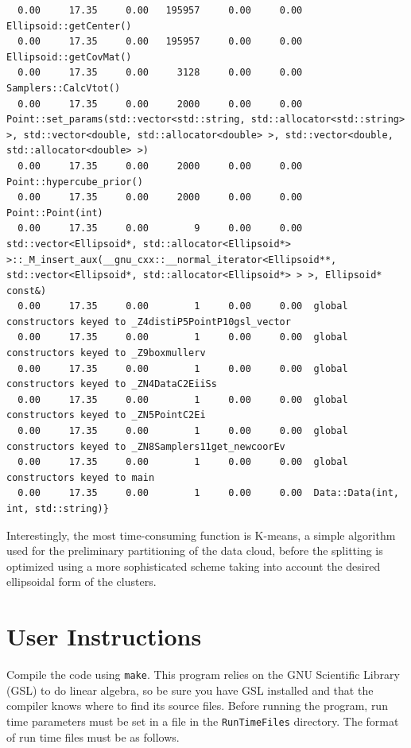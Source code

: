 \documentclass{article}
\begin{document}
\begin{verbatim}
  0.00     17.35     0.00   195957     0.00     0.00  Ellipsoid::getCenter()
  0.00     17.35     0.00   195957     0.00     0.00  Ellipsoid::getCovMat()
  0.00     17.35     0.00     3128     0.00     0.00  Samplers::CalcVtot()
  0.00     17.35     0.00     2000     0.00     0.00  Point::set_params(std::vector<std::string, std::allocator<std::string> >, std::vector<double, std::allocator<double> >, std::vector<double, std::allocator<double> >)
  0.00     17.35     0.00     2000     0.00     0.00  Point::hypercube_prior()
  0.00     17.35     0.00     2000     0.00     0.00  Point::Point(int)
  0.00     17.35     0.00        9     0.00     0.00  std::vector<Ellipsoid*, std::allocator<Ellipsoid*> >::_M_insert_aux(__gnu_cxx::__normal_iterator<Ellipsoid**, std::vector<Ellipsoid*, std::allocator<Ellipsoid*> > >, Ellipsoid* const&)
  0.00     17.35     0.00        1     0.00     0.00  global constructors keyed to _Z4distiP5PointP10gsl_vector
  0.00     17.35     0.00        1     0.00     0.00  global constructors keyed to _Z9boxmullerv
  0.00     17.35     0.00        1     0.00     0.00  global constructors keyed to _ZN4DataC2EiiSs
  0.00     17.35     0.00        1     0.00     0.00  global constructors keyed to _ZN5PointC2Ei
  0.00     17.35     0.00        1     0.00     0.00  global constructors keyed to _ZN8Samplers11get_newcoorEv
  0.00     17.35     0.00        1     0.00     0.00  global constructors keyed to main
  0.00     17.35     0.00        1     0.00     0.00  Data::Data(int, int, std::string)}
\end{verbatim}
Interestingly, the most time-consuming function is K-means, a simple algorithm used for the preliminary partitioning of the data cloud, before the splitting is optimized using a more sophisticated scheme taking into account the desired ellipsoidal form of the clusters.
\section{User Instructions}
Compile the code using {\tt make}.  This program relies on the GNU Scientific Library (GSL) to do linear algebra, so be sure  you have GSL installed and that the compiler knows where to find its source files. Before running the program, run time parameters must be set in a file in the {\tt RunTimeFiles} directory. The format of run time files must be as follows. 
\end{document}

